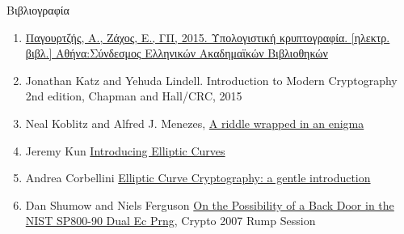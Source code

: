 \documentclass[handout]{beamer}
\begin{document}
\begin{frame}{Βιβλιογραφία}
\begin{tiny}
\begin{enumerate}
\item \href{http://hdl.handle.net/11419/5439}{Παγουρτζής, Α., Ζάχος, Ε., ΓΠ, 2015. Υπολογιστική κρυπτογραφία. [ηλεκτρ. βιβλ.] Αθήνα:Σύνδεσμος Ελληνικών Ακαδημαϊκών Βιβλιοθηκών}

\item Jonathan Katz and Yehuda Lindell. Introduction to Modern Cryptography 2nd edition,  Chapman and Hall/CRC, 2015

\item Neal Koblitz and Alfred J. Menezes, \href{http://eprint.iacr.org/2015/1018.pdf}{A riddle wrapped in an enigma} 
\item Jeremy Kun \href{http://jeremykun.com/2014/02/08/introducing-elliptic-curves/}{Introducing Elliptic Curves}
\item Andrea Corbellini \href{http://andrea.corbellini.name/2015/05/17/elliptic-curve-cryptography-a-gentle-introduction/}{Elliptic Curve Cryptography: a gentle introduction}
\item Dan Shumow and Niels Ferguson \href{http://rump2007.cr.yp.to/15-shumow.pdf}{On the Possibility of a Back Door in the NIST SP800-90 Dual Ec Prng}, Crypto 2007 Rump Session


\end{enumerate}
\end{tiny}
\end{frame}
\end{document}
